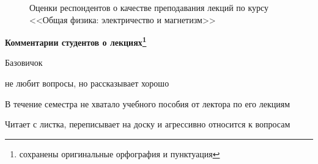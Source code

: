 \begin{figure}[H]
\begin{subfigure}[b]{0.45\textwidth}
			\end{subfigure}
			\caption{Оценки респондентов о качестве преподавания лекций по курсу <<Общая физика: электричество и магнетизм>>}
		\end{figure}

		\textbf{Комментарии студентов о лекциях\protect\footnote{сохранены оригинальные орфография и пунктуация}}
			\begin{commentbox} 
				Базовичок 
			\end{commentbox} 
			
			\begin{commentbox} 
				не любит вопросы, но рассказывает хорошо 
			\end{commentbox} 
		
			\begin{commentbox} 
				В течение семестра не хватало учебного пособия от лектора по его лекциям  
			\end{commentbox} 
		
			\begin{commentbox} 
				Читает с листка, переписывает на доску и агрессивно относится к вопросам 
			\end{commentbox} 
    
    
